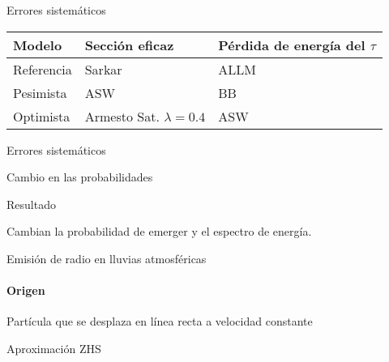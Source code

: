 \begin{frame}{Errores sistem\'aticos}
	\begin{block}{}
		\begin{center}
			\hspace{2mm}
		\end{center}
	\end{block}
	\begin{exampleblock}{}
		\begin{center}
			\begin{tabular}{|l|l|l|}
			\hline
			\textbf{Modelo}      & Secci\'on eficaz& P\'erdida de energ\'ia del $\tau$ \\ 
			\hline
			Referencia &    Sarkar     & ALLM\\ 
			Pesimista &  ASW &     BB\\ 
			Optimista &   Armesto Sat. $\lambda=0.4$&  ASW\\
			\hline 
			\end{tabular}  
		\end{center}
	\end{exampleblock}
\end{frame}

\begin{frame}{Errores sistem\'aticos}
	\begin{block}{Cambio en las probabilidades}
		\begin{center}
		\end{center}
	\end{block}
	\begin{exampleblock}{Resultado}
		\begin{center}
			Cambian la probabilidad de emerger y el espectro de energ\'ia.
		\end{center}
	\end{exampleblock}
\end{frame}


\begin{frame}{Emisi\'on de radio en lluvias atmosf\'ericas}
\framesubtitle{Origen}
\footnotesize
	
	\begin{block}{Part\'icula que se desplaza en l\'inea recta a velocidad constante}
		\begin{center}
		\end{center}
	\end{block}
	
	\begin{block}{Aproximaci\'on ZHS}
		\begin{center}
		\end{center}
	\end{block}
\end{frame}

